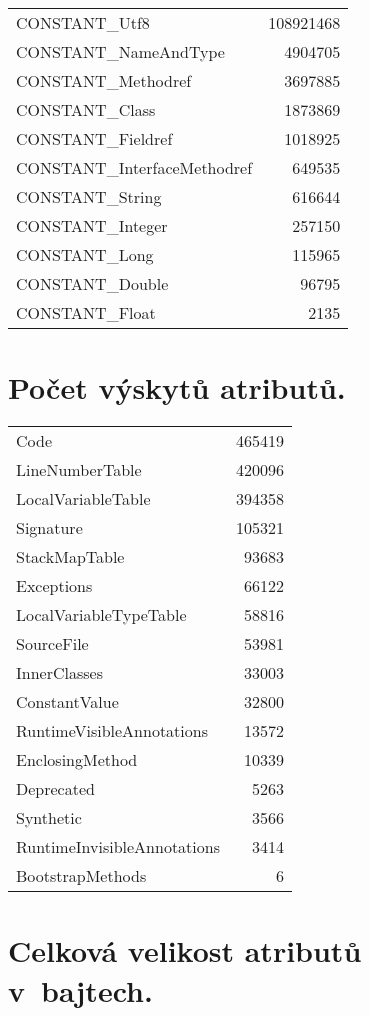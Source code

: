   \begin{tabular}{l r}
	CONSTANT\_Utf8	&	108921468	\\
	CONSTANT\_NameAndType	&	4904705	\\
	CONSTANT\_Methodref	&	3697885	\\
	CONSTANT\_Class	&	1873869	\\
	CONSTANT\_Fieldref	&	1018925	\\
	CONSTANT\_InterfaceMethodref	&	649535	\\
	CONSTANT\_String	&	616644	\\
	CONSTANT\_Integer	&	257150	\\
	CONSTANT\_Long	&	115965	\\
	CONSTANT\_Double	&	96795	\\
	CONSTANT\_Float	&	2135
  \end{tabular}

\section{Počet výskytů atributů.}\label{attrf}

  \begin{tabular}{l r}
	Code	&	465419	\\
	LineNumberTable	&	420096	\\
	LocalVariableTable	&	394358	\\
	Signature	&	105321	\\
	StackMapTable	&	93683	\\
	Exceptions	&	66122	\\
	LocalVariableTypeTable	&	58816	\\
	SourceFile	&	53981	\\
	InnerClasses	&	33003	\\
	ConstantValue	&	32800	\\
	RuntimeVisibleAnnotations	&	13572	\\
	EnclosingMethod	&	10339	\\
	Deprecated	&	5263	\\
	Synthetic	&	3566	\\
	RuntimeInvisibleAnnotations	&	3414	\\
	BootstrapMethods	&	6	
  \end{tabular}

\section{Celková velikost atributů v~bajtech.}\label{attrs}

